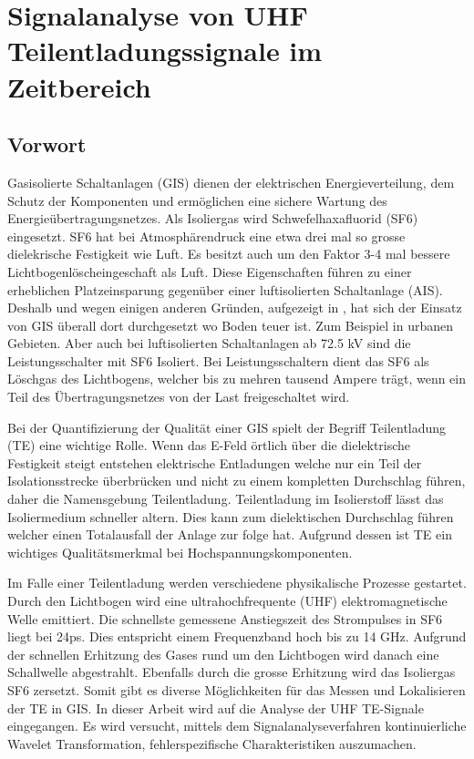 %
%
%
\chapter{Signalanalyse von UHF Teilentladungssignale im Zeitbereich \label{chapter:gis}}
\begin{refsection}

\section{Vorwort}

Gasisolierte Schaltanlagen (GIS) dienen der elektrischen Energieverteilung, dem Schutz der Komponenten und ermöglichen eine sichere Wartung des Energieübertragungsnetzes.
Als Isoliergas wird Schwefelhaxafluorid (SF6) eingesetzt. SF6 hat bei Atmosphärendruck eine etwa drei mal so grosse dielekrische Festigkeit wie Luft. 
Es besitzt auch um den Faktor 3-4 mal bessere Lichtbogenlöscheingeschaft als Luft. 
Diese Eigenschaften führen zu einer erheblichen Platzeinsparung gegenüber einer luftisolierten Schaltanlage (AIS). \cite{buch:ABB}
Deshalb und wegen einigen anderen Gründen, aufgezeigt in \cite{buch:GIS/AIS}, hat sich der Einsatz von GIS überall dort durchgesetzt wo Boden teuer ist. Zum Beispiel in urbanen Gebieten. Aber auch bei luftisolierten Schaltanlagen ab 72.5 kV sind die Leistungsschalter mit SF6 Isoliert. 
Bei Leistungsschaltern dient das SF6 als Löschgas des Lichtbogens, welcher bis zu mehren tausend Ampere trägt, wenn ein Teil des Übertragungsnetzes von der Last freigeschaltet wird. \cite{buch:ABB} 

Bei der Quantifizierung der Qualität einer GIS spielt der Begriff Teilentladung (TE) eine wichtige Rolle. 
Wenn das E-Feld örtlich über die dielektrische Festigkeit steigt entstehen elektrische Entladungen welche nur ein Teil der Isolationsstrecke überbrücken und nicht zu einem kompletten Durchschlag führen, daher die Namensgebung Teilentladung. \cite{buch:Kuchler}
Teilentladung im Isolierstoff lässt das Isoliermedium  schneller altern. Dies kann zum dielektischen Durchschlag führen welcher einen Totalausfall der Anlage zur folge hat.
Aufgrund dessen ist TE ein wichtiges Qualitätsmerkmal bei Hochspannungskomponenten. 

Im Falle einer Teilentladung werden verschiedene  physikalische Prozesse gestartet. 
Durch den Lichtbogen wird eine ultrahochfrequente (UHF) elektromagnetische Welle emittiert.
Die schnellste gemessene Anstiegszeit des Strompulses in SF6 liegt bei 24ps.
Dies entspricht einem Frequenzband hoch bis zu 14 GHz. \cite{skript:Judd24ps} 
Aufgrund der schnellen Erhitzung des Gases rund um den Lichtbogen wird danach eine Schallwelle abgestrahlt. 
Ebenfalls durch die grosse Erhitzung wird das Isoliergas SF6 zersetzt. 
Somit gibt es diverse Möglichkeiten für das Messen und Lokalisieren der TE in GIS. \cite{skript:StatusReviewPDMeasurement}
In dieser Arbeit wird auf die Analyse der UHF TE-Signale eingegangen. Es wird versucht, mittels dem Signalanalyseverfahren kontinuierliche Wavelet Transformation, fehlerspezifische Charakteristiken auszumachen.


\end{refsection}
